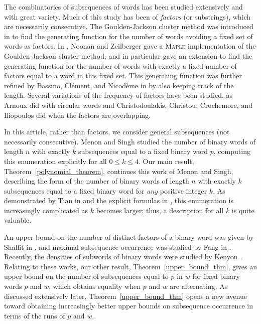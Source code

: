\documentclass[11pt]{amsart}
\begin{document}
The combinatorics of subsequences of words has been studied extensively and with great variety. Much of this study has been of \emph{factors} (or substrings), which are necessarily consecutive. The Goulden-Jackson cluster method was introduced in \cite{GJ1,GJ2} to find the generating function for the number of words avoiding a fixed set of words as factors. In \cite{noonan_zeilberger}, Noonan and Zeilberger gave a \textsc{Maple} implementation of the Goulden-Jackson cluster method, and in particular gave an extension to find the generating function for the number of words with exactly a fixed number of factors equal to a word in this fixed set. This generating function was further refined by Bassino, Cl\'ement, and Nicod\`eme in \cite{MGF_GJCM} by also keeping track of the length. Several variations of the frequency of factors have been studied, as Arnoux \cite{circular_words} did with circular words and Christodoulakis, Christou, Crochemore, and Iliopoulos \cite{overlapping} did when the factors are overlapping.

In this article, rather than factors, we consider general subsequences (not necessarily consecutive). Menon and Singh \cite{subseq_freq} studied the number of binary words of length $n$ with exactly $k$ subsequences equal to a fixed binary word $p$, computing this enumeration explicitly for all $0\leq k\leq4$. Our main result, Theorem~\ref{polynomial_theorem}, continues this work of Menon and Singh, describing the form of the number of binary words of length $n$ with exactly $k$ subsequences equal to a fixed binary word for \emph{any} positive integer $k$. As demonstrated by Tian in \cite[Equation 2]{other_formula_for_occurrence_count} and the explicit formulas in \cite{subseq_freq}, this enumeration is increasingly complicated as $k$ becomes larger; thus, a description for all $k$ is quite valuable.

An upper bound on the number of distinct factors of a binary word was given by Shallit in \cite{factor_occurrence_upper_bound}, and maximal subsequence occurrence was studied by Fang in \cite{fang2025maximalnumbersubwordoccurrences}. Recently, the densities of subwords of binary words were studied by Kenyon \cite{kenyon}. Relating to these works, our other result, Theorem~\ref{upper_bound_thm}, gives an upper bound on the number of subsequences equal to $p$ in $w$ for fixed binary words $p$ and $w$, which obtains equality when $p$ and $w$ are alternating. As discussed extensively later, Theorem~\ref{upper_bound_thm} opens a new avenue toward obtaining increasingly better upper bounds on subsequence occurrence in terms of the runs of $p$ and $w$.
\end{document}
